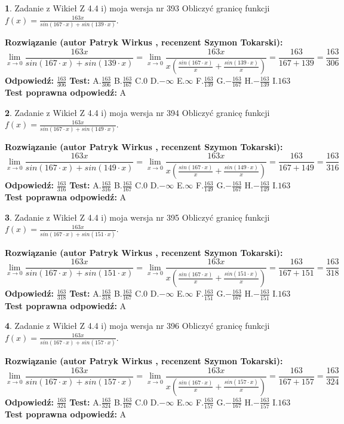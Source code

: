 \documentclass[12pt, a4paper]{article}
\theoremstyle{definition} %
\newtheorem{zad}{}
\newcommand{\zadStart}[1]{\begin{zad}#1\newline}
\newcommand{\zadStop}{\end{zad}}
\newcommand{\rozwStart}[2]{\noindent \textbf{Rozwiązanie (autor #1 , recenzent #2): }\newline}
\newcommand{\rozwStop}{\newline}
\newcommand{\odpStart}{\noindent \textbf{Odpowiedź:}\newline}
\newcommand{\odpStop}{\newline}
\newcommand{\testStart}{\noindent \textbf{Test:}\newline}
\newcommand{\testStop}{\newline}
\newcommand{\kluczStart}{\noindent \textbf{Test poprawna odpowiedź:}\newline}
\newcommand{\kluczStop}{\newline}
\begin{document}
\zadStart{Zadanie z Wikieł Z 4.4 i) moja wersja nr 393}
Obliczyć granicę funkcji $f(x)=\frac{163x}{sin(167\cdot x) +sin(139\cdot x)}$.
\zadStop
\rozwStart{Patryk Wirkus}{Szymon Tokarski}
$$\lim\limits_{x\to 0}\frac{163x}{sin(167\cdot x) +sin(139\cdot x)}=\lim\limits_{x\to 0}\frac{163x}{x(\frac{sin(167\cdot x)}{x}+\frac{sin(139\cdot x)}{x})}=\frac{163}{167+139} = \frac{163}{306}$$
\rozwStop
\odpStart
$\frac{163}{306}$
\odpStop
\testStart
A.$\frac{163}{306}$
B.$\frac{163}{167}$
C.$0$
D.$-\infty$
E.$\infty$
F.$\frac{163}{139}$
G.$-\frac{163}{167}$
H.$-\frac{163}{139}$
I.$163$
\testStop
\kluczStart
A
\kluczStop



\zadStart{Zadanie z Wikieł Z 4.4 i) moja wersja nr 394}
Obliczyć granicę funkcji $f(x)=\frac{163x}{sin(167\cdot x) +sin(149\cdot x)}$.
\zadStop
\rozwStart{Patryk Wirkus}{Szymon Tokarski}
$$\lim\limits_{x\to 0}\frac{163x}{sin(167\cdot x) +sin(149\cdot x)}=\lim\limits_{x\to 0}\frac{163x}{x(\frac{sin(167\cdot x)}{x}+\frac{sin(149\cdot x)}{x})}=\frac{163}{167+149} = \frac{163}{316}$$
\rozwStop
\odpStart
$\frac{163}{316}$
\odpStop
\testStart
A.$\frac{163}{316}$
B.$\frac{163}{167}$
C.$0$
D.$-\infty$
E.$\infty$
F.$\frac{163}{149}$
G.$-\frac{163}{167}$
H.$-\frac{163}{149}$
I.$163$
\testStop
\kluczStart
A
\kluczStop



\zadStart{Zadanie z Wikieł Z 4.4 i) moja wersja nr 395}
Obliczyć granicę funkcji $f(x)=\frac{163x}{sin(167\cdot x) +sin(151\cdot x)}$.
\zadStop
\rozwStart{Patryk Wirkus}{Szymon Tokarski}
$$\lim\limits_{x\to 0}\frac{163x}{sin(167\cdot x) +sin(151\cdot x)}=\lim\limits_{x\to 0}\frac{163x}{x(\frac{sin(167\cdot x)}{x}+\frac{sin(151\cdot x)}{x})}=\frac{163}{167+151} = \frac{163}{318}$$
\rozwStop
\odpStart
$\frac{163}{318}$
\odpStop
\testStart
A.$\frac{163}{318}$
B.$\frac{163}{167}$
C.$0$
D.$-\infty$
E.$\infty$
F.$\frac{163}{151}$
G.$-\frac{163}{167}$
H.$-\frac{163}{151}$
I.$163$
\testStop
\kluczStart
A
\kluczStop



\zadStart{Zadanie z Wikieł Z 4.4 i) moja wersja nr 396}
Obliczyć granicę funkcji $f(x)=\frac{163x}{sin(167\cdot x) +sin(157\cdot x)}$.
\zadStop
\rozwStart{Patryk Wirkus}{Szymon Tokarski}
$$\lim\limits_{x\to 0}\frac{163x}{sin(167\cdot x) +sin(157\cdot x)}=\lim\limits_{x\to 0}\frac{163x}{x(\frac{sin(167\cdot x)}{x}+\frac{sin(157\cdot x)}{x})}=\frac{163}{167+157} = \frac{163}{324}$$
\rozwStop
\odpStart
$\frac{163}{324}$
\odpStop
\testStart
A.$\frac{163}{324}$
B.$\frac{163}{167}$
C.$0$
D.$-\infty$
E.$\infty$
F.$\frac{163}{157}$
G.$-\frac{163}{167}$
H.$-\frac{163}{157}$
I.$163$
\testStop
\kluczStart
A
\kluczStop
\end{document}
